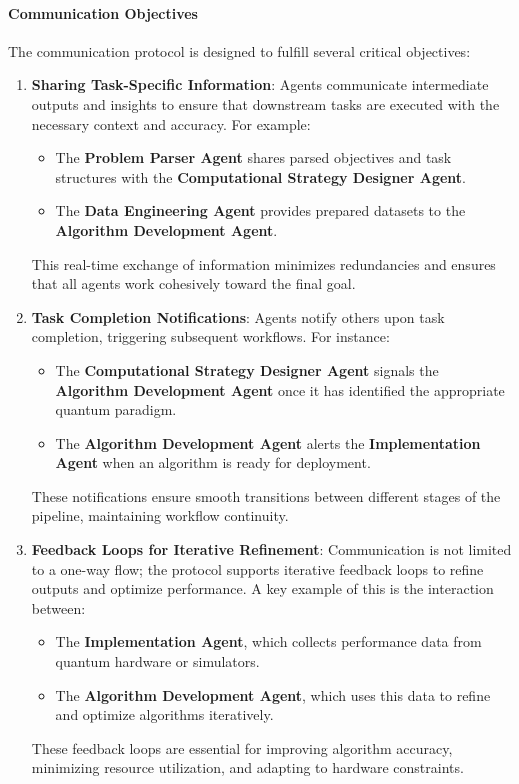 \documentclass[12pt]{article}
\begin{document}
\paragraph{Communication Objectives}
The communication protocol is designed to fulfill several critical objectives:
\begin{enumerate}
    \item \textbf{Sharing Task-Specific Information}: Agents communicate intermediate outputs and insights to ensure that downstream tasks are executed with the necessary context and accuracy. For example:
    \begin{itemize}
        \item The \textbf{Problem Parser Agent} shares parsed objectives and task structures with the \textbf{Computational Strategy Designer Agent}.
        \item The \textbf{Data Engineering Agent} provides prepared datasets to the \textbf{Algorithm Development Agent}.
    \end{itemize}
    This real-time exchange of information minimizes redundancies and ensures that all agents work cohesively toward the final goal.

    \item \textbf{Task Completion Notifications}: Agents notify others upon task completion, triggering subsequent workflows. For instance:
    \begin{itemize}
        \item The \textbf{Computational Strategy Designer Agent} signals the \textbf{Algorithm Development Agent} once it has identified the appropriate quantum paradigm.
        \item The \textbf{Algorithm Development Agent} alerts the \textbf{Implementation Agent} when an algorithm is ready for deployment.
    \end{itemize}
    These notifications ensure smooth transitions between different stages of the pipeline, maintaining workflow continuity.

    \item \textbf{Feedback Loops for Iterative Refinement}: Communication is not limited to a one-way flow; the protocol supports iterative feedback loops to refine outputs and optimize performance. A key example of this is the interaction between:
    \begin{itemize}
        \item The \textbf{Implementation Agent}, which collects performance data from quantum hardware or simulators.
        \item The \textbf{Algorithm Development Agent}, which uses this data to refine and optimize algorithms iteratively.
    \end{itemize}
    These feedback loops are essential for improving algorithm accuracy, minimizing resource utilization, and adapting to hardware constraints.
\end{enumerate}
\end{document}
